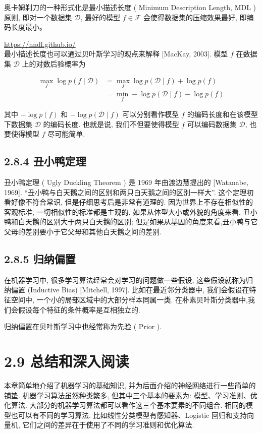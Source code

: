 \documentclass[10pt]{article}
\begin{document}
奥卡姆剃刀的一种形式化是最小描述长度 ( Minimum Description Length, MDL ) 原则, 即对一个数据集 $\mathcal{D}$, 最好的模型 $f \in \mathcal{F}$ 会使得数据集的压缩效果最好, 即编码长度最小。

\href{https://nndl.github.io/}{https://nndl.github.io/}\\
最小描述长度也可以通过贝叶斯学习的观点来解释 [MacKay, 2003]. 模型 $f$ 在数据集 $\mathcal{D}$ 上的对数后验概率为


\begin{align*}
\max _{f} \log p(f \mid \mathcal{D}) & =\max _{f} \log p(\mathcal{D} \mid f)+\log p(f)  \tag{2.89}\\
& =\min _{f}-\log p(\mathcal{D} \mid f)-\log p(f) \tag{2.90}
\end{align*}


其中 $-\log p(f)$ 和 $-\log p(\mathcal{D} \mid f)$ 可以分别看作模型 $f$ 的编码长度和在该模型下数据集 $\mathcal{D}$ 的编码长度. 也就是说, 我们不但要使得模型 $f$ 可以编码数据集 $\mathcal{D}$, 也要使得模型 $f$ 尽可能简单.

\subsection*{2.8.4 丑小鸭定理}
丑小鸭定理 ( Ugly Duckling Theorem ) 是 1969 年由渡边慧提出的 [Watanabe, 1969]. “丑小鸭与白天鹅之间的区别和两只白天鹅之间的区别一样大”. 这个定理初看好像不符合常识, 但是仔细思考后是非常有道理的. 因为世界上不存在相似性的客观标准, 一切相似性的标准都是主观的. 如果从体型大小或外貌的角度来看, 丑小鸭和白天鹅的区别大于两只白天鹅的区别; 但是如果从基因的角度来看,丑小鸭与它父母的差别要小于它父母和其他白天鹅之间的差别.

\subsection*{2.8.5 归纳偏置}
在机器学习中, 很多学习算法经常会对学习的问题做一些假设, 这些假设就称为归纳偏置 (Inductive Bias) [Mitchell, 1997]. 比如在最近邻分类器中, 我们会假设在特征空间中, 一个小的局部区域中的大部分样本同属一类. 在朴素贝叶斯分类器中,我们会假设每个特征的条件概率是互相独立的.

归纳偏置在贝叶斯学习中也经常称为先验 ( Prior ).

\section*{2.9 总结和深入阅读}
本章简单地介绍了机器学习的基础知识, 并为后面介绍的神经网络进行一些简单的铺垫. 机器学习算法虽然种类繁多, 但其中三个基本的要素为: 模型、学习准则、优化算法. 大部分的机器学习算法都可以看作这三个基本要素的不同组合. 相同的模型也可以有不同的学习算法. 比如线性分类模型有感知器、Logistic 回归和支持向量机, 它们之间的差异在于使用了不同的学习准则和优化算法.
\end{document}
